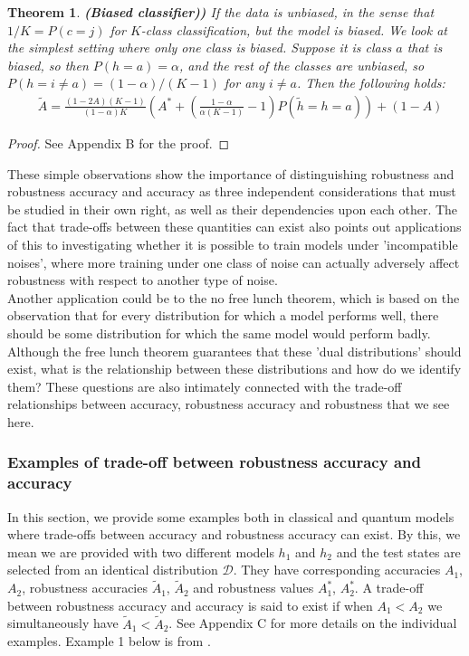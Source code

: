 \documentclass[onecolumn,prx, superscriptaddress,longbibliography,margin=1mm 11pt]{revtex4-2}
\newtheorem{theorem}{Theorem}
\begin{document}
\begin{theorem} \textbf{(Biased classifier))} \label{theorem2}
\textit{If the data is unbiased, in the sense that $1/K=P(c=j)$ for $K$-class classification, but the model is biased. We look at the simplest setting where only one class is biased. Suppose it is class $a$ that is biased, so then $P(h=a)=\alpha$, and the rest of the classes are unbiased, so $P(h=i \neq a)=(1-\alpha)/(K-1)$ for any $i \neq a$. Then the following holds:
\begin{align} \label{eq:lemma2}
  & \tilde{A}=\frac{(1-2A)(K-1)}{(1-\alpha)K} 
\left(A^*+\left(\frac{1-\alpha}{\alpha (K-1)}-1\right)P(\tilde{h}=h=a)\right)    +(1-A)
\end{align}}
\end{theorem}
\begin{proof}
    See Appendix B for the proof. 
\end{proof}
These simple observations show the importance of distinguishing robustness and robustness accuracy and accuracy as three independent considerations that must be studied in their own right, as well as their dependencies upon each other. The fact that trade-offs between these quantities can exist also points out applications of this to investigating whether it is possible to train models under 'incompatible noises', where more training under one class of noise can actually adversely affect robustness with respect to another type of noise. \\

Another application could be to the no free lunch theorem, which is based on the observation that for every distribution for which a model performs well, there should be some distribution for which the same model would perform badly. Although the free lunch theorem guarantees that these 'dual distributions' should exist, what is the relationship between these distributions and how do we identify them? These questions are also intimately connected with the trade-off relationships between accuracy, robustness accuracy and robustness that we see here. 

\subsubsection{Examples of trade-off between robustness accuracy and accuracy}
In this section, we provide some examples both in classical and quantum models where trade-offs between accuracy and robustness accuracy can exist. By this, we mean we are provided with two different models $h_1$ and $h_2$ and the test states are selected from an identical distribution $\mathcal{D}$. They have corresponding accuracies $A_1$, $A_2$, robustness accuracies $\tilde{A}_1$, $\tilde{A}_2$ and robustness values $A^*_1$, $A^*_2$. A trade-off between robustness accuracy and accuracy is said to exist if when $A_1<A_2$ we simultaneously have $\tilde{A}_1 < \tilde{A}_2$. See Appendix C for more details on the individual examples. Example 1 below is from \cite{tsipras2018robustness}. \\ 
\end{document}
